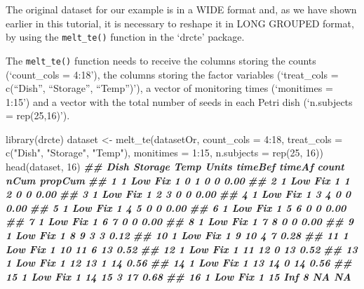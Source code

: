 \documentclass[
]{book}
\newenvironment{Shaded}{\begin{snugshade}}{\end{snugshade}}
\newcommand{\AttributeTok}[1]{\textcolor[rgb]{0.77,0.63,0.00}{#1}}
\newcommand{\DecValTok}[1]{\textcolor[rgb]{0.00,0.00,0.81}{#1}}
\newcommand{\DocumentationTok}[1]{\textcolor[rgb]{0.56,0.35,0.01}{\textbf{\textit{#1}}}}
\newcommand{\FunctionTok}[1]{\textcolor[rgb]{0.00,0.00,0.00}{#1}}
\newcommand{\NormalTok}[1]{#1}
\newcommand{\OtherTok}[1]{\textcolor[rgb]{0.56,0.35,0.01}{#1}}
\newcommand{\SpecialCharTok}[1]{\textcolor[rgb]{0.00,0.00,0.00}{#1}}
\newcommand{\StringTok}[1]{\textcolor[rgb]{0.31,0.60,0.02}{#1}}
\begin{document}
The original dataset for our example is in a WIDE format and, as we have shown earlier in this tutorial, it is necessary to reshape it in LONG GROUPED format, by using the \texttt{melt\_te()} function in the `drcte' package.

The \texttt{melt\_te()} function needs to receive the columns storing the counts (`count\_cols = 4:18'), the columns storing the factor variables (`treat\_cols = c(``Dish'', ``Storage'', ``Temp'')'), a vector of monitoring times (`monitimes = 1:15') and a vector with the total number of seeds in each Petri dish (`n.subjects = rep(25,16)').

\begin{Shaded}
\begin{Highlighting}[]
\FunctionTok{library}\NormalTok{(drcte)}
\NormalTok{dataset }\OtherTok{\textless{}{-}} \FunctionTok{melt\_te}\NormalTok{(datasetOr, }\AttributeTok{count\_cols =} \DecValTok{4}\SpecialCharTok{:}\DecValTok{18}\NormalTok{, }
                   \AttributeTok{treat\_cols =} \FunctionTok{c}\NormalTok{(}\StringTok{"Dish"}\NormalTok{, }\StringTok{"Storage"}\NormalTok{, }\StringTok{"Temp"}\NormalTok{), }
                   \AttributeTok{monitimes =} \DecValTok{1}\SpecialCharTok{:}\DecValTok{15}\NormalTok{, }\AttributeTok{n.subjects =} \FunctionTok{rep}\NormalTok{(}\DecValTok{25}\NormalTok{, }\DecValTok{16}\NormalTok{))}
\FunctionTok{head}\NormalTok{(dataset, }\DecValTok{16}\NormalTok{)}
\DocumentationTok{\#\#    Dish Storage Temp Units timeBef timeAf count nCum propCum}
\DocumentationTok{\#\# 1     1     Low  Fix     1       0      1     0    0    0.00}
\DocumentationTok{\#\# 2     1     Low  Fix     1       1      2     0    0    0.00}
\DocumentationTok{\#\# 3     1     Low  Fix     1       2      3     0    0    0.00}
\DocumentationTok{\#\# 4     1     Low  Fix     1       3      4     0    0    0.00}
\DocumentationTok{\#\# 5     1     Low  Fix     1       4      5     0    0    0.00}
\DocumentationTok{\#\# 6     1     Low  Fix     1       5      6     0    0    0.00}
\DocumentationTok{\#\# 7     1     Low  Fix     1       6      7     0    0    0.00}
\DocumentationTok{\#\# 8     1     Low  Fix     1       7      8     0    0    0.00}
\DocumentationTok{\#\# 9     1     Low  Fix     1       8      9     3    3    0.12}
\DocumentationTok{\#\# 10    1     Low  Fix     1       9     10     4    7    0.28}
\DocumentationTok{\#\# 11    1     Low  Fix     1      10     11     6   13    0.52}
\DocumentationTok{\#\# 12    1     Low  Fix     1      11     12     0   13    0.52}
\DocumentationTok{\#\# 13    1     Low  Fix     1      12     13     1   14    0.56}
\DocumentationTok{\#\# 14    1     Low  Fix     1      13     14     0   14    0.56}
\DocumentationTok{\#\# 15    1     Low  Fix     1      14     15     3   17    0.68}
\DocumentationTok{\#\# 16    1     Low  Fix     1      15    Inf     8   NA      NA}
\end{Highlighting}
\end{Shaded}
\end{document}
